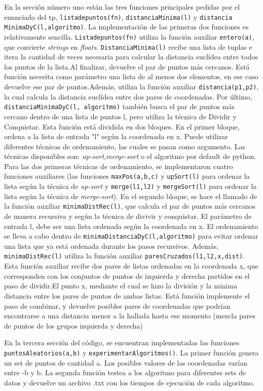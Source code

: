 \documentclass[12pt,a4paper,titlepage]{article}
\begin{document}
En la sección número uno están las tres funciones principales pedidas por el enunciado del tp, \texttt{listadepuntos(fn)}, \texttt{distanciaMinima(l)} y \texttt{distancia MinimaDyC(l,algoritmo)}. La implementación de las primeras dos funciones es relativamente sencilla. \texttt{Listadepuntos(fn)} utiliza la función auxiliar \texttt{entero(a)}, que convierte \textit{strings} en \textit{floats}. \texttt{DistanciaMinima(l)} recibe una lista de tuplas e itera la cantidad de veces necesaria para calcular la distancia euclídea entre todos los puntos de la lista.Al finalizar, devuelve el par de puntos más cercanos. Está función necesita como parámetro una lista de al menos dos elementos, en ese caso devuelve ese par de puntos.Además, utiliza la función auxiliar \texttt{distancia(p1,p2)}, la cual calcula la distancia euclídea entre dos pares de coordenadas. Por último, \texttt{distanciaMinimaDyC(l, algoritmo)} también busca el par de puntos más cercano dentro de una lista de puntos l, pero utiliza la técnica de Dividir y Conquistar. Esta función está dividida en dos bloques. En el primer bloque, ordena a la lista de entrada "l" según la coordenada en x. Puede utilizar diferentes técnicas de ordenamiento, las cuales se pasan como argumento. Las técnicas disponibles son: \textit{up-sort},\textit{merge-sort} o el algoritmo por default de python. Para las dos primeras técnicas de ordenamiento, se implementaron cuatro funciones auxiliares (las funciones  \texttt{maxPos(a,b,c)} y \texttt{upSort(l)} para ordenar la lista según la técnica de \textit{up-sort} y  \texttt{merge(l1,l2)} y \texttt{mergeSort(l)} para ordenar la lista según la técnica de \textit{merge-sort}). En el segundo bloque, se hace el llamado de la función auxiliar \texttt{minimaDistRec(l)}, que calcula el par de puntos más cercanos de manera recursiva y según la técnica de divivir y conquistar. El parámetro de entrada l, debe ser una lista ordenada según la coordenada en x. El ordenamiento se lleva a cabo dentro de \texttt{minimaDistanciaDyC(l,algoritmo)} para evitar ordenar una lista que ya está ordenada durante los pasos recursivos. Además, \texttt{minimaDistRec(l)} utiliza la función auxiliar \texttt{paresCruzados(l1,l2,x,dist)}. Esta función auxiliar recibe dos pares de listas ordenadas en la coordenada x, que corresponden con los conjuntos de puntos de izquierda y derecha partidos en el paso de dividir.El punto x, mediante el cual se hizo la división y la minima distancia entre los pares de puntos de ambas listas. Está función implemente el paso de combinar, y devuelve posibles pares de coordenadas que podrían encontrarse a una distancia menor a la hallada hasta ese momento (mezcla pares de puntos de los grupos izquierda y derecha)\par 
En la tercera sección del código, se encuentran implementadas las funciones \texttt{puntosAleatorios(a,b)} y \texttt{experimentarAlgoritmos()}. La primer función genera un set de puntos de cantidad a. Los posibles valores de las coordenadas varían  entre -b y b. La segunda función testea a los algoritmo para diferentes sets de datos y devuelve un archivo .txt con los tiempos de ejecución de cada algoritmo. \par 
\end{document}
